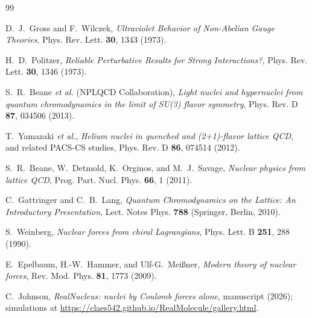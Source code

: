 \documentclass[11pt]{article}
\begin{document}
\begin{thebibliography}{99}

 D.~J.~Gross and F.~Wilczek,
\emph{Ultraviolet Behavior of Non-Abelian Gauge Theories},
Phys. Rev. Lett. \textbf{30}, 1343 (1973).

 H.~D.~Politzer,
\emph{Reliable Perturbative Results for Strong Interactions?},
Phys. Rev. Lett. \textbf{30}, 1346 (1973).

 S.~R.~Beane \emph{et al.} (NPLQCD Collaboration),
\emph{Light nuclei and hypernuclei from quantum chromodynamics in the limit of SU(3) flavor symmetry},
Phys. Rev. D \textbf{87}, 034506 (2013).

 T.~Yamazaki \emph{et al.},
\emph{Helium nuclei in quenched and (2+1)-flavor lattice QCD}, and related PACS-CS studies,
Phys. Rev. D \textbf{86}, 074514 (2012).

 S.~R.~Beane, W.~Detmold, K.~Orginos, and M.~J.~Savage,
\emph{Nuclear physics from lattice QCD},
Prog. Part. Nucl. Phys. \textbf{66}, 1 (2011).

 C.~Gattringer and C.~B.~Lang,
\emph{Quantum Chromodynamics on the Lattice: An Introductory Presentation},
Lect. Notes Phys. \textbf{788} (Springer, Berlin, 2010).

 S.~Weinberg,
\emph{Nuclear forces from chiral Lagrangians},
Phys. Lett. B \textbf{251}, 288 (1990).

 E.~Epelbaum, H.-W.~Hammer, and Ulf-G.~Mei\ss ner,
\emph{Modern theory of nuclear forces},
Rev. Mod. Phys. \textbf{81}, 1773 (2009).

 C.~Johnson,
\emph{RealNucleus: nuclei by Coulomb forces alone},
manuscript (2026); simulations at \url{https://claes542.github.io/RealMolecule/gallery.html}.

\end{thebibliography}
\end{document}
